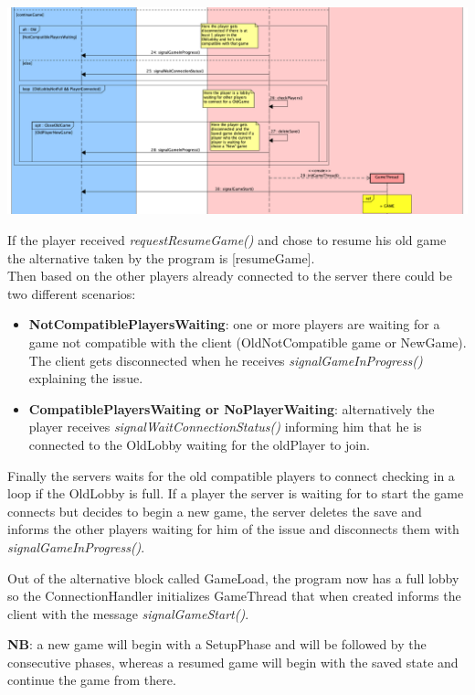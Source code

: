 \documentclass[12pt]{article}
\begin{document}
				\begin{center}
					\includegraphics[width=\textwidth,height=\textheight,keepaspectratio]{Connection_4}
				\end{center}
			
				If the player received \emph{requestResumeGame()} and chose to resume his old game the alternative taken by the program is [resumeGame]. \\
				Then based on the other players already connected to the server there could be two different scenarios:
				\begin{itemize}
					\item \textbf{NotCompatiblePlayersWaiting}: one or more players are waiting for a game not compatible with the client (OldNotCompatible game or NewGame). The client gets disconnected when he receives \emph{signalGameInProgress()} explaining the issue.
					\item \textbf{CompatiblePlayersWaiting or NoPlayerWaiting}: alternatively the player receives \emph{signalWaitConnectionStatus()} informing him that he is connected to the OldLobby waiting for the oldPlayer to join.
				\end{itemize}
				Finally the servers waits for the old compatible players to connect checking in a loop if the OldLobby is full. If a player the server is waiting for to start the game connects but decides to begin a new game, the server deletes the save and informs the other players waiting for him of the issue and disconnects them with \emph{signalGameInProgress()}.
				
				Out of the alternative block called GameLoad, the program now has a full lobby so the ConnectionHandler initializes GameThread that when created informs the client with the message \emph{signalGameStart()}.	
				
				\textbf{NB}: a new game will begin with a SetupPhase and will be followed by the consecutive phases, whereas a resumed game will begin with the saved state and continue the game from there. 			
				
\end{document}

